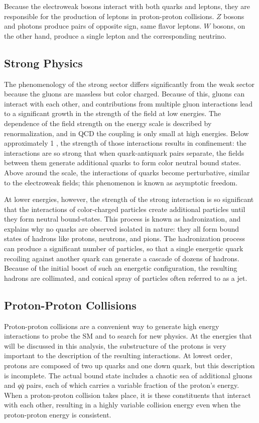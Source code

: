 Because the electroweak bosons interact with both quarks and leptons, they are responsible for the production of leptons in proton-proton collisions.
$Z$ bosons and photons produce pairs of opposite sign, same flavor leptons.
$W$ bosons, on the other hand, produce a single lepton and the corresponding neutrino.

\subsection{Strong Physics}
\label{sec:strong}

The phenomenology of the strong sector differs significantly from the weak sector because the gluons are massless but color charged.
Because of this, gluons can interact with each other, and contributions from multiple gluon interactions lead to a significant growth in the strength of the field at low energies.
The dependence of the field strength on the energy scale is described by renormalization, and in \ac{QCD} the coupling is only small at high energies.
Below approximately 1 \GeV, the strength of those interactions results in confinement: the interactions are so strong that when quark-antiquark pairs separate, the fields between them generate additional quarks to form color neutral bound states. 
Above around the \GeV scale, the interactions of quarks become perturbative, similar to the electroweak fields; this phenomenon is known as asymptotic freedom.

At lower energies, however, the strength of the strong interaction is so significant that the interactions of color-charged particles create additional particles until they form neutral bound-states.
This process is known as hadronization, and explains why no quarks are observed isolated in nature: they all form bound states of hadrons like protons, neutrons, and pions.
The hadronization process can produce a significant number of particles, so that a single energetic quark recoiling against another quark can generate a cascade of dozens of hadrons.
Because of the initial boost of such an energetic configuration, the resulting hadrons are collimated, and conical spray of particles often referred to as a jet.

\subsection{Proton-Proton Collisions}
\label{sec:ppcollisions}

Proton-proton collisions are a convenient way to generate high energy interactions to probe the \ac{SM} and to search for new physics.
At the energies that will be discussed in this analysis, the substructure of the protons is very important to the description of the resulting interactions.
At lowest order, protons are composed of two up quarks and one down quark, but this description is incomplete.
The actual bound state includes a chaotic sea of additional gluons and $q\bar q$ pairs, each of which carries a variable fraction of the proton's energy.
When a proton-proton collision takes place, it is these constituents that interact with each other, resulting in a highly variable collision energy even when the proton-proton energy is consistent.

